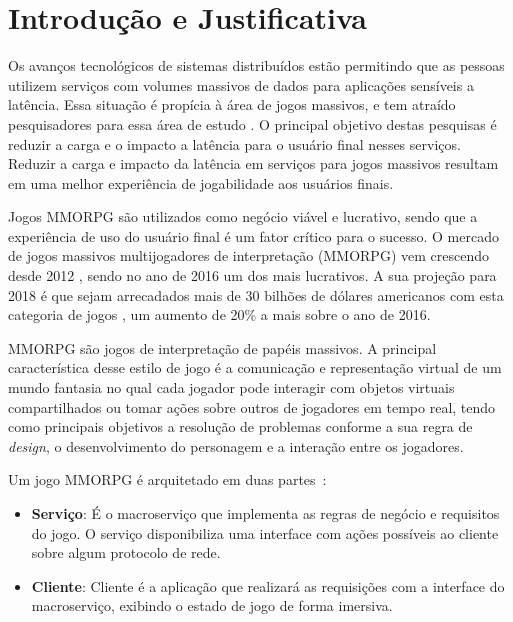\section{Introdução e Justificativa}
\label{sec:int}

Os avanços tecnológicos de sistemas distribuídos estão permitindo que as pessoas utilizem serviços com volumes massivos de dados para aplicações sensíveis a latência.
%
Essa situação é propícia à área de jogos massivos, e tem atraído pesquisadores para essa área de estudo \cite{mmo_analytic,1417630,6267019,6063041}.
%
O principal objetivo destas pesquisas é reduzir a carga e o impacto a latência para o usuário final nesses serviços.
%
Reduzir a carga e impacto da latência em serviços para jogos massivos resultam em uma melhor experiência de jogabilidade aos usuários finais\cite{1417630}.


Jogos \ac{MMORPG} são utilizados como negócio viável e lucrativo, sendo que a experiência de uso do usuário final é um fator crítico para o sucesso.
%
O mercado de jogos massivos multijogadores de interpretação (\ac{MMORPG}) vem crescendo desde 2012 \cite{new_york_times}, sendo no ano de 2016 um dos mais lucrativos\cite{statista_2016}.
%
A sua projeção para 2018 é que sejam arrecadados mais de 30 bilhões de dólares americanos com esta categoria de jogos \cite{statista_2018}, um aumento de 20\% a mais sobre o ano de 2016.



\ac{MMORPG} são jogos de interpretação de papéis massivos.
%
A principal característica desse estilo de jogo é a comunicação e representação virtual de um mundo fantasia no qual cada jogador pode interagir com objetos virtuais compartilhados ou tomar ações sobre outros de jogadores em tempo real, tendo como principais objetivos a resolução de problemas conforme a sua regra de \textit{design}, o desenvolvimento do personagem e a interação entre os jogadores\cite{video_game_technologies}.
%

Um jogo \ac{MMORPG} é arquitetado em duas partes~\cite{mmo_analytic}:
\begin{itemize}
  \item \textbf{Serviço}: É o macroserviço que implementa as regras de negócio e requisitos do jogo.
  O serviço disponibiliza uma interface com ações possíveis ao cliente sobre algum protocolo de rede.
  \item \textbf{Cliente}: Cliente é a aplicação que realizará as requisições com a interface do macroserviço, exibindo o estado de jogo de forma imersiva.
\end{itemize}

